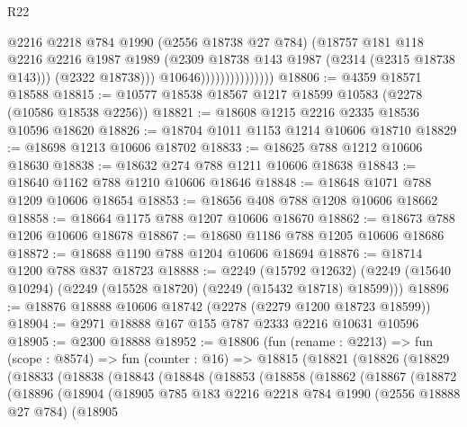 \begin{lexlean}{R22}
\begin{coremodule}
                                    @2216
                                    @2218
                                    @784
                                    @1990
                                    (@2556 @18738 @27 @784)
                                    (@18757
                                      @181
                                      @118
                                      @2216
                                      @2216
                                      @1987
                                      @1989
                                      (@2309 @18738 @143 @1987 (@2314 (@2315 @18738 @143)))
                                      (@2322 @18738)))
                                  @10646)))))))))))))))
@18806 := @4359 @18571 @18588
@18815 := @10577 @18538 @18567 @1217 @18599 @10583 (@2278 (@10586 @18538 @2256))
@18821 := @18608 @1215 @2216 @2335 @18536 @10596 @18620
@18826 := @18704 @1011 @1153 @1214 @10606 @18710
@18829 := @18698 @1213 @10606 @18702
@18833 := @18625 @788 @1212 @10606 @18630
@18838 := @18632 @274 @788 @1211 @10606 @18638
@18843 := @18640 @1162 @788 @1210 @10606 @18646
@18848 := @18648 @1071 @788 @1209 @10606 @18654
@18853 := @18656 @408 @788 @1208 @10606 @18662
@18858 := @18664 @1175 @788 @1207 @10606 @18670
@18862 := @18673 @788 @1206 @10606 @18678
@18867 := @18680 @1186 @788 @1205 @10606 @18686
@18872 := @18688 @1190 @788 @1204 @10606 @18694
@18876 := @18714 @1200 @788 @837 @18723
@18888 := @2249
    (@15792 @12632)
    (@2249 (@15640 @10294) (@2249 (@15528 @18720) (@2249 (@15432 @18718) @18599)))
@18896 := @18876 @18888 @10606 @18742 (@2278 (@2279 @1200 @18723 @18599))
@18904 := @2971 @18888 @167 @155 @787 @2333 @2216 @10631 @10596
@18905 := @2300 @18888
@18952 := @18806
    (fun (rename : @2213) =>
    fun (scope : @8574) =>
    fun (counter : @16) =>
    @18815
      (@18821
        (@18826
          (@18829
            (@18833
              (@18838
                (@18843
                  (@18848
                    (@18853
                      (@18858
                        (@18862
                          (@18867
                            (@18872
                              (@18896
                                (@18904
                                  (@18905
                                    @785
                                    @183
                                    @2216
                                    @2218
                                    @784
                                    @1990
                                    (@2556 @18888 @27 @784)
                                    (@18905

\end{coremodule}
\end{lexlean}
